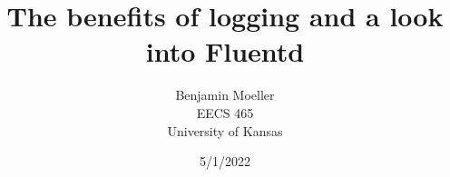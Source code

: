 \documentclass{article}
\title{The benefits of logging and a look into Fluentd}
\author{Benjamin Moeller \\ EECS 465 \\ University of Kansas}
\date{5/1/2022}
\begin{document}
\maketitle
\begin{multicols}{2}


      
\end{multicols}
\end{document}
